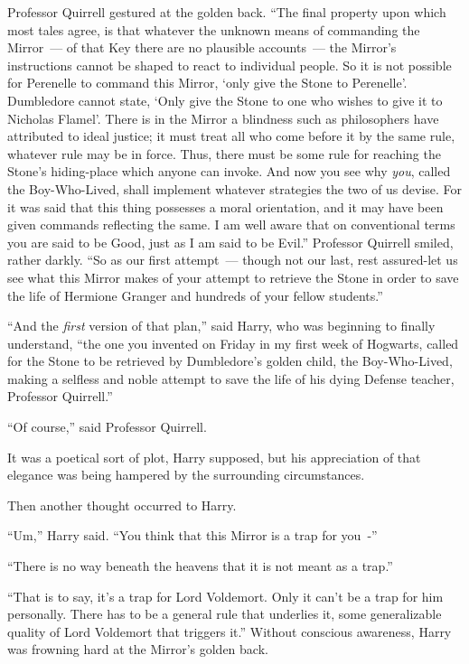 Professor Quirrell gestured at the golden back. ``The final property upon which most tales agree, is that whatever the unknown means of commanding the Mirror~--- of that Key there are no plausible accounts~--- the Mirror's instructions cannot be shaped to react to individual people. So it is not possible for Perenelle to command this Mirror, `only give the Stone to Perenelle'. Dumbledore cannot state, `Only give the Stone to one who wishes to give it to Nicholas Flamel'. There is in the Mirror a blindness such as philosophers have attributed to ideal justice; it must treat all who come before it by the same rule, whatever rule may be in force. Thus, there must be some rule for reaching the Stone's hiding-place which anyone can invoke. And now you see why \emph{you}, called the Boy-Who-Lived, shall implement whatever strategies the two of us devise. For it was said that this thing possesses a moral orientation, and it may have been given commands reflecting the same. I am well aware that on conventional terms you are said to be Good, just as I am said to be Evil.'' Professor Quirrell smiled, rather darkly. ``So as our first attempt~--- though not our last, rest assured-let us see what this Mirror makes of your attempt to retrieve the Stone in order to save the life of Hermione Granger and hundreds of your fellow students.''

``And the \emph{first} version of that plan,'' said Harry, who was beginning to finally understand, ``the one you invented on Friday in my first week of Hogwarts, called for the Stone to be retrieved by Dumbledore's golden child, the Boy-Who-Lived, making a selfless and noble attempt to save the life of his dying Defense teacher, Professor Quirrell.''

``Of course,'' said Professor Quirrell.

It was a poetical sort of plot, Harry supposed, but his appreciation of that elegance was being hampered by the surrounding circumstances.

Then another thought occurred to Harry.

``Um,'' Harry said. ``You think that this Mirror is a trap for you~-''

``There is no way beneath the heavens that it is not meant as a trap.''

``That is to say, it's a trap for Lord Voldemort. Only it can't be a trap for him personally. There has to be a general rule that underlies it, some generalizable quality of Lord Voldemort that triggers it.'' Without conscious awareness, Harry was frowning hard at the Mirror's golden back.

